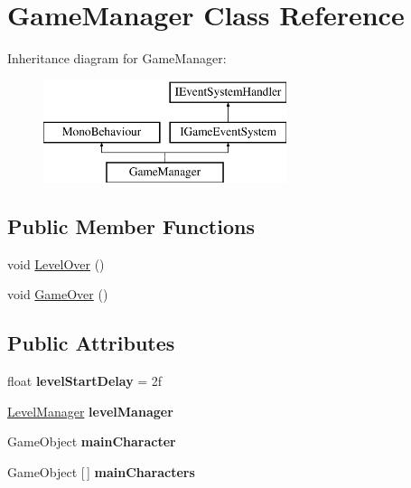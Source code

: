 \hypertarget{class_game_manager}{}\section{Game\+Manager Class Reference}
\label{class_game_manager}
Inheritance diagram for Game\+Manager\+:\begin{figure}[H]
\begin{center}
\leavevmode
\includegraphics[height=3.000000cm]{class_game_manager}
\end{center}
\end{figure}
\subsection*{Public Member Functions}
\begin{DoxyCompactItemize}
\item 
void \mbox{\hyperlink{class_game_manager_ad5ae8ae2e2fe74743e89e70b47563639}{Level\+Over}} ()
\item 
void \mbox{\hyperlink{class_game_manager_a8d69157cb6b97eabeff2374d8e9adeaf}{Game\+Over}} ()
\end{DoxyCompactItemize}
\subsection*{Public Attributes}
\begin{DoxyCompactItemize}
\item 
\mbox{\label{class_game_manager_a2195c4ae8d753a31d968d7c8347668de}} 
float {\bfseries level\+Start\+Delay} = 2f
\item 
\mbox{\label{class_game_manager_a7b315d0972b05be3ed9c011ae09d5231}} 
\mbox{\hyperlink{class_level_manager}{Level\+Manager}} {\bfseries level\+Manager}
\item 
\mbox{\label{class_game_manager_a6b205783f48dd535e8db182d69e55ed7}} 
Game\+Object {\bfseries main\+Character}
\item 
\mbox{\label{class_game_manager_a7840e876ed4c196856834b1d144033cc}} 
Game\+Object \mbox{[}$\,$\mbox{]} {\bfseries main\+Characters}
\end{DoxyCompactItemize}
